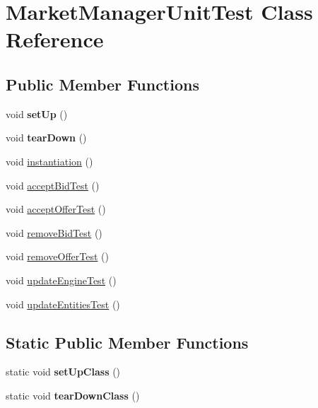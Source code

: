 \hypertarget{class_market_manager_unit_test}{\section{Market\+Manager\+Unit\+Test Class Reference}
\label{class_market_manager_unit_test}
}
\subsection*{Public Member Functions}
\begin{DoxyCompactItemize}
\item 
\hypertarget{class_market_manager_unit_test_a7675c43ec3a21669742870c5ff7bcdef}{void {\bfseries set\+Up} ()}\label{class_market_manager_unit_test_a7675c43ec3a21669742870c5ff7bcdef}

\item 
\hypertarget{class_market_manager_unit_test_a8ce1dfb5c96973d49b3b1308bc9b77b9}{void {\bfseries tear\+Down} ()}\label{class_market_manager_unit_test_a8ce1dfb5c96973d49b3b1308bc9b77b9}

\item 
void \hyperlink{class_market_manager_unit_test_a975ffc40c27926b93d755a313440c35a}{instantiation} ()
\item 
void \hyperlink{class_market_manager_unit_test_aadbb351148ad8792ffdc73d21a477d46}{accept\+Bid\+Test} ()
\item 
void \hyperlink{class_market_manager_unit_test_a048bcd980b57e21cf535525c3d354327}{accept\+Offer\+Test} ()
\item 
void \hyperlink{class_market_manager_unit_test_ad15bca438fb420eb4edc10d2a6d5d69b}{remove\+Bid\+Test} ()
\item 
void \hyperlink{class_market_manager_unit_test_a3a39f91093490fa570428eeadbee53d8}{remove\+Offer\+Test} ()
\item 
void \hyperlink{class_market_manager_unit_test_a1c14446d8fae8ccdc8bbfb43054a5528}{update\+Engine\+Test} ()
\item 
void \hyperlink{class_market_manager_unit_test_ac830f868e90ae29122ae6382a4d227de}{update\+Entities\+Test} ()
\end{DoxyCompactItemize}
\subsection*{Static Public Member Functions}
\begin{DoxyCompactItemize}
\item 
\hypertarget{class_market_manager_unit_test_a5ecff1008c99832638bca96b9a12c129}{static void {\bfseries set\+Up\+Class} ()}\label{class_market_manager_unit_test_a5ecff1008c99832638bca96b9a12c129}

\item 
\hypertarget{class_market_manager_unit_test_a6384859a83037cf70ee3a30835e9067e}{static void {\bfseries tear\+Down\+Class} ()}\label{class_market_manager_unit_test_a6384859a83037cf70ee3a30835e9067e}

\end{DoxyCompactItemize}


